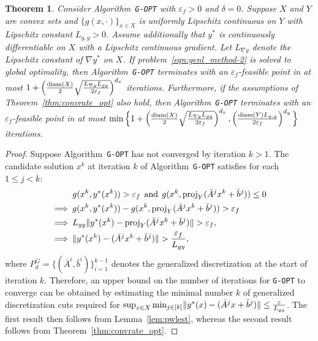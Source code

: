 \documentclass{article}
\DeclarePairedDelimiter\norm{\lVert}{\rVert}%
\newcommand{\1}[1]{\mathds{1}\left[#1\right]}
\newtheorem{theorem}{Theorem}[]
\begin{document}
\begin{theorem}
\label{thm:convrate_gopt}
Consider Algorithm~\texttt{G-OPT} with $\varepsilon_f > 0$ and $\delta = 0$.
Suppose $X$ and $Y$ are convex sets and $\{g(x,\cdot)\}_{x \in X}$ is uniformly Lipschitz continuous on $Y$ with Lipschitz constant $L_{g,y} > 0$.
Assume additionally that $y^*$ is continuously differentiable on $X$ with a Lipschitz continuous gradient. Let $L_{\nabla y}$ denote the Lipschitz constant of $\nabla y^*$ on $X$.
If problem~\eqref{eqn:genl_method-2} is solved to \textit{global} optimality, then Algorithm~\texttt{G-OPT} terminates with an $\varepsilon_f$-feasible point in at most $1 + \left(\frac{\textup{diam}(X)}{2}\sqrt{\frac{L_{\nabla y} L_{gy}}{2\varepsilon_f}}\right)^{d_x}$ iterations.
Furthermore, if the assumptions of Theorem~\ref{thm:convrate_opt} also hold, then Algorithm~\texttt{G-OPT} terminates with an $\varepsilon_f$-feasible point in at most \mbox{$\min\Big\{1 + \left(\frac{\textup{diam}(X)}{2}\sqrt{\frac{L_{\nabla y} L_{gy}}{2\varepsilon_f}}\right)^{d_x}, \left(\frac{\textup{diam}(Y) L_{g,y}}{2\varepsilon_f}\right)^{d_y}\Big\}$} iterations.
\end{theorem}
\begin{proof}
Suppose Algorithm~\texttt{G-OPT} has not converged by iteration $k > 1$.
The candidate solution $x^k$ at iteration $k$ of Algorithm~\texttt{G-OPT} satisfies for each $1 \leq j < k$:
\begin{align*}
&g(x^k,y^*(x^k)) > \varepsilon_f \:\: \text{and} \:\: g(x^k,\text{proj}_Y(\bar{A}^j x^k + \bar{b}^j)) \leq 0 \\
\implies \: & g(x^k, y^*(x^k)) - g(x^k, \text{proj}_Y(\bar{A}^j x^k + \bar{b}^j)) > \varepsilon_f \\
\implies \: & L_{gy} \norm{y^*(x^k) - \text{proj}_Y(\bar{A}^j x^k + \bar{b}^j)} > \varepsilon_f, \\
\implies \: & \norm{y^*(x^k) - (\bar{A}^j x^k + \bar{b}^j)} > \frac{\varepsilon_f}{L_{gy}},
\end{align*}
where $P^G_d = \{(\bar{A}^i, \bar{b}^i)\}_{i=1}^{k-1}$ denotes the generalized discretization at the start of iteration $k$.
Therefore, an upper bound on the number of iterations for \texttt{G-OPT} to converge can be obtained by estimating the minimal number $k$ of generalized discretization cuts required for $\sup_{x \in X} \min_{j \in [k]} \norm{y^*(x) - (\bar{A}^j x + \bar{b}^j)} \leq \frac{\varepsilon}{L_{gy}}$.
The first result then follows from Lemma~\ref{lem:pwlest}, whereas the second result follows from Theorem~\ref{thm:convrate_opt}.
\end{proof}
\end{document}
